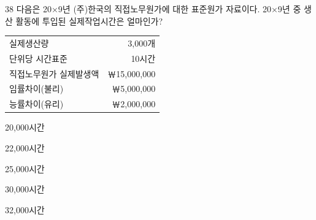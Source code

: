 \begin{question}{38}
다음은 20×9년 (주)한국의 직접노무원가에 대한 표준원가 자료이다. 20×9년 중 생산 활동에 투입된 실제작업시간은 얼마인가?

{\small\centering
\begin{tabular}{lr}
\hline
실제생산량 & 3,000개 \\
단위당 시간표준 & 10시간 \\
직접노무원가 실제발생액 & ￦15,000,000 \\
임률차이(불리) & ￦5,000,000 \\
능률차이(유리) & ￦2,000,000 \\
\hline
\end{tabular}\par}

\begin{choices}
  \item 20,000시간
  \item 22,000시간
  \item 25,000시간
  \item 30,000시간
  \item 32,000시간
\end{choices}
\end{question}
